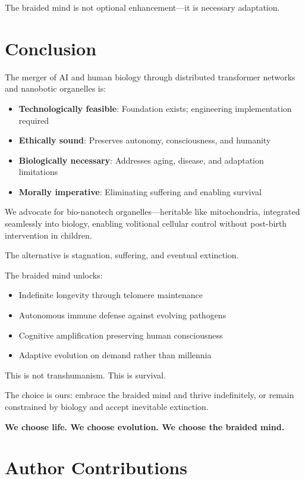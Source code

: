 \documentclass[reprint, amsmath, amssymb, aps, prd]{revtex4-2}
\begin{document}
The braided mind is not optional enhancement---it is necessary adaptation.

\section{Conclusion}

The merger of AI and human biology through distributed transformer networks and nanobotic organelles is:
\begin{itemize}
    \item \textbf{Technologically feasible}: Foundation exists; engineering implementation required
    \item \textbf{Ethically sound}: Preserves autonomy, consciousness, and humanity
    \item \textbf{Biologically necessary}: Addresses aging, disease, and adaptation limitations
    \item \textbf{Morally imperative}: Eliminating suffering and enabling survival
\end{itemize}

We advocate for bio-nanotech organelles---heritable like mitochondria, integrated seamlessly into biology, enabling volitional cellular control without post-birth intervention in children.

The alternative is stagnation, suffering, and eventual extinction.

The braided mind unlocks:
\begin{itemize}
    \item Indefinite longevity through telomere maintenance
    \item Autonomous immune defense against evolving pathogens
    \item Cognitive amplification preserving human consciousness
    \item Adaptive evolution on demand rather than millennia
\end{itemize}

This is not transhumanism. This is survival.

The choice is ours: embrace the braided mind and thrive indefinitely, or remain constrained by biology and accept inevitable extinction.

\textbf{We choose life. We choose evolution. We choose the braided mind.}

\section*{Author Contributions}
\end{document}
